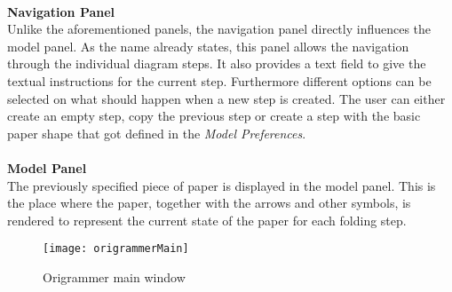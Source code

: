 \\
\textbf{Navigation Panel}\\
Unlike the aforementioned panels, the navigation panel directly influences the model panel. As the name already states, this panel allows the navigation through the individual diagram steps. It also provides a text field to give the textual instructions for the current step. Furthermore different options can be selected on what should happen when a new step is created. The user can either create an empty step, copy the previous step or create a step with the basic paper shape that got defined in the \emph{Model Preferences}.\\
\\
\textbf{Model Panel}\\
The previously specified piece of paper is displayed in the model panel. This is the place where the paper, together with the arrows and other symbols, is rendered to represent the current state of the paper for each folding step.
\begin{figure}[h]
	\centering
	\texttt{[image: origrammerMain]}
	\caption{Origrammer main window}
	\label{fig:origrammerMain}
\end{figure}